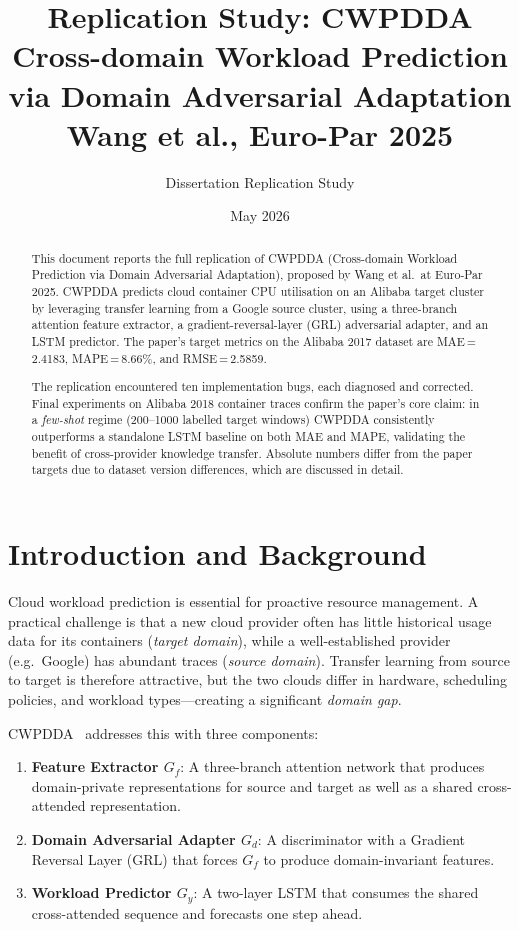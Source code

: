\documentclass[12pt,a4paper]{article}
\title{%
    \textbf{Replication Study: CWPDDA}\\[0.4em]
    \large Cross-domain Workload Prediction via Domain Adversarial Adaptation\\[0.3em]
    \normalsize Wang et al., Euro-Par 2025
}
\author{Dissertation Replication Study}
\date{May 2026}
\begin{document}
\maketitle
\tableofcontents
\newpage

\begin{abstract}
This document reports the full replication of CWPDDA (Cross-domain Workload Prediction
via Domain Adversarial Adaptation), proposed by Wang et al.\ at Euro-Par 2025.
CWPDDA predicts cloud container CPU utilisation on an Alibaba target cluster by
leveraging transfer learning from a Google source cluster, using a three-branch
attention feature extractor, a gradient-reversal-layer (GRL) adversarial adapter,
and an LSTM predictor.
The paper's target metrics on the Alibaba 2017 dataset are MAE\,=\,2.4183,
MAPE\,=\,8.66\%, and RMSE\,=\,2.5859.

The replication encountered ten implementation bugs, each diagnosed and corrected.
Final experiments on Alibaba 2018 container traces confirm the paper's core claim:
in a \emph{few-shot} regime (200–1000 labelled target windows) CWPDDA consistently
outperforms a standalone LSTM baseline on both MAE and MAPE, validating the benefit
of cross-provider knowledge transfer.  Absolute numbers differ from the paper targets
due to dataset version differences, which are discussed in detail.
\end{abstract}

\section{Introduction and Background}

Cloud workload prediction is essential for proactive resource management.
A practical challenge is that a new cloud provider often has little historical
usage data for its containers (\emph{target domain}), while a well-established
provider (e.g.\ Google) has abundant traces (\emph{source domain}).
Transfer learning from source to target is therefore attractive, but the two
clouds differ in hardware, scheduling policies, and workload types—creating a
significant \emph{domain gap}.

CWPDDA~\cite{wang2025cwpdda} addresses this with three components:
\begin{enumerate}
    \item \textbf{Feature Extractor $G_f$}: A three-branch attention network that
    produces domain-private representations for source and target as well as a
    shared cross-attended representation.
    \item \textbf{Domain Adversarial Adapter $G_d$}: A discriminator with a
    Gradient Reversal Layer (GRL) that forces $G_f$ to produce
    domain-invariant features.
    \item \textbf{Workload Predictor $G_y$}: A two-layer LSTM that consumes the
    shared cross-attended sequence and forecasts one step ahead.
\end{enumerate}
\end{document}
